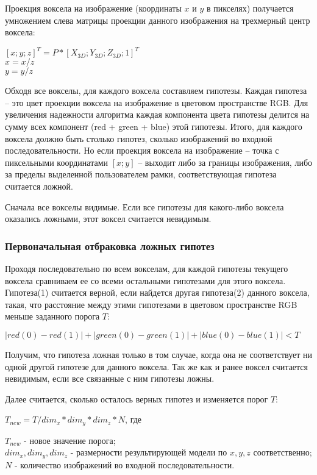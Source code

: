 Проекция воксела на изображение (координаты $x$ и $y$ в пикселях) получается умножением слева матрицы проекции данного изображения на трехмерный центр воксела:

\begin{center}
	$[x;y;z]^T = P*[X_{3D};Y_{3D};Z_{3D};1]^T$ \\
	$x = x/z$ \\
	$y = y/z$
\end{center}

Обходя все вокселы, для каждого воксела составляем гипотезы. Каждая гипотеза – это цвет проекции воксела на изображение в цветовом пространстве RGB. Для увеличения надежности алгоритма каждая компонента цвета гипотезы делится на сумму всех компонент (red + green + blue) этой гипотезы. Итого, для каждого воксела должно быть столько гипотез, сколько изображений во входной последовательности. Но если проекция воксела на изображение -- точка с пиксельными координатами $[x;y]$ -- выходит либо за границы изображения, либо за пределы выделенной пользователем рамки, соответствующая гипотеза считается ложной.

Сначала все вокселы видимые. Если все гипотезы для какого-либо воксела оказались ложными, этот воксел считается невидимым.

\subsubsection{Первоначальная отбраковка ложных гипотез}
Проходя последовательно по всем вокселам, для каждой гипотезы текущего воксела сравниваем ее со всеми остальными гипотезами для этого воксела. Гипотеза(1) считается верной, если найдется другая гипотеза(2) данного воксела, такая, что расстояние между этими гипотезами в цветовом пространстве RGB меньше заданного порога $T$:

\begin{center}
	$\lvert {red(0)} - {red(1)}\rvert + \lvert {green(0)} - {green(1)}\rvert + \lvert {blue(0)} - {blue(1)}\rvert < T$
\end{center}

Получим, что гипотеза ложная только в том случае, когда она не соответствует ни одной другой гипотезе для данного воксела. Так же как и ранее воксел считается невидимым, если все связанные с ним гипотезы ложны.

Далее считается, сколько осталось верных гипотез и изменяется порог $T$:

\begin{center}
	$T_{new} = T/{dim_x*dim_y*dim_z*N}$, где
\end{center}
$T_{new}$ - новое значение порога;\\
$dim_x, dim_y, dim_z$ - размерности результирующей модели по $x,y,z$ соответственно;\\
$N$ - количество изображений во входной последовательности.

